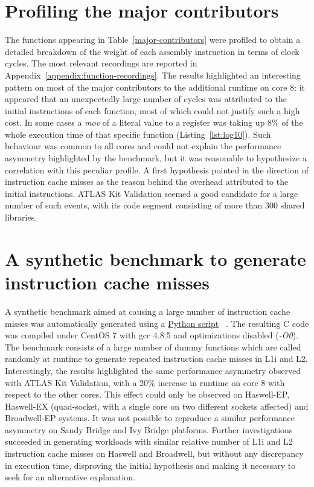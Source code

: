 \documentclass[a4paper]{jpconf}
\begin{document}
\section{Profiling the major contributors}
The functions appearing in Table~\ref{major-contributors} were profiled to obtain
a detailed breakdown of the weight of each assembly instruction in terms of
clock cycles. The most relevant recordings are reported in Appendix~\ref{appendix:function-recordings}. 
The results highlighted an interesting pattern on most of the major contributors to 
the additional runtime on core 8:  it appeared that an unexpectedly
large number of cycles was attributed to the initial instructions of each function,
most of which could not justify such a high cost. In some cases a
\textit{mov} of a literal value to a register was taking up 8\% of the whole
execution time of that specific function (Listing~\ref{lst:log10}).
Such behaviour was common to all cores and could not explain the performance
asymmetry highlighted by the benchmark, but it was reasonable to hypothesize
a correlation with this peculiar profile. A first hypothesis
pointed in the direction of instruction cache misses as the reason behind
the overhead attributed to the initial instructions.
ATLAS Kit Validation seemed a good candidate for a large number of such events,
with its code segment consisting of more than 300 shared libraries.

\section{A synthetic benchmark to generate instruction cache misses}
A synthetic benchmark aimed at causing a large number of instruction cache
misses was automatically generated using a \href{https://gitlab.cern.ch/snippets/216}{Python script} ~\cite{synthetic_benchmark:icache_misses}.
The resulting C code was compiled
under CentOS 7 with gcc 4.8.5 and optimizations disabled (\textit{-O0}). The benchmark 
consists of a large number of dummy functions which are called randomly at runtime to generate
repeated instruction cache misses in L1i and L2. Interestingly, the results
highlighted the same performance asymmetry observed with ATLAS Kit Validation,
with a 20\% increase in runtime on core 8 with respect to the other cores.
This effect could only be observed on Haswell-EP, Haswell-EX (quad-socket, with
a single core on two different sockets affected) and Broadwell-EP systems. It
was not possible to reproduce a similar performance asymmetry on Sandy Bridge
and Ivy Bridge platforms.
Further investigations succeeded in generating
workloads with similar relative number of L1i and L2 instruction cache misses
on Haswell and Broadwell, but without any discrepancy in execution time,
disproving the initial hypothesis and making it necessary to seek for an
alternative explanation.
\end{document}
